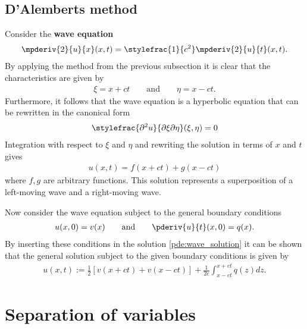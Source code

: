 \subsection{D'Alemberts method}

    Consider the \textbf{wave equation}
    \begin{gather}
        \label{pde:wave_equation}
        \mpderiv{2}{u}{x}(x, t) = \stylefrac{1}{c^2}\mpderiv{2}{u}{t}(x, t).
    \end{gather}
    By applying the method from the previous subsection it is clear that the characteristics are given by
    \begin{gather}
        \xi = x + ct\qquad\text{and}\qquad \eta = x - ct.
    \end{gather}
    Furthermore, it follows that the wave equation is a hyperbolic equation that can be rewritten in the canonical form
    \begin{gather}
        \label{pde:canonical_wave_equation}
        \stylefrac{\partial^2u}{\partial\xi\partial\eta}(\xi,\eta) = 0
    \end{gather}
    Integration with respect to $\xi$ and $\eta$ and rewriting the solution in terms of $x$ and $t$ gives
    \begin{gather}
        \label{pde:wave_solution}
        u(x, t) = f(x+ct) + g(x-ct)
    \end{gather}
    where $f, g$ are arbitrary functions. This solution represents a superposition of a left-moving wave and a right-moving wave.

    Now consider the wave equation subject to the general boundary conditions
    \begin{gather}
        u(x, 0) = v(x)\qquad\text{and}\qquad \pderiv{u}{t}(x, 0) = q(x).
    \end{gather}
    By inserting these conditions in the solution \ref{pde:wave_solution} it can be shown that the general solution subject to the given boundary conditions is given by
    \begin{gather}
        \label{pde:dalembert_solution}
        u(x, t) := \frac{1}{2}\left[v(x+ct) + v(x-ct)\right] + \frac{1}{2c}\int_{x-ct}^{x+ct}q(z)dz.
    \end{gather}

\section{Separation of variables}\label{section:separation_of_variables}

